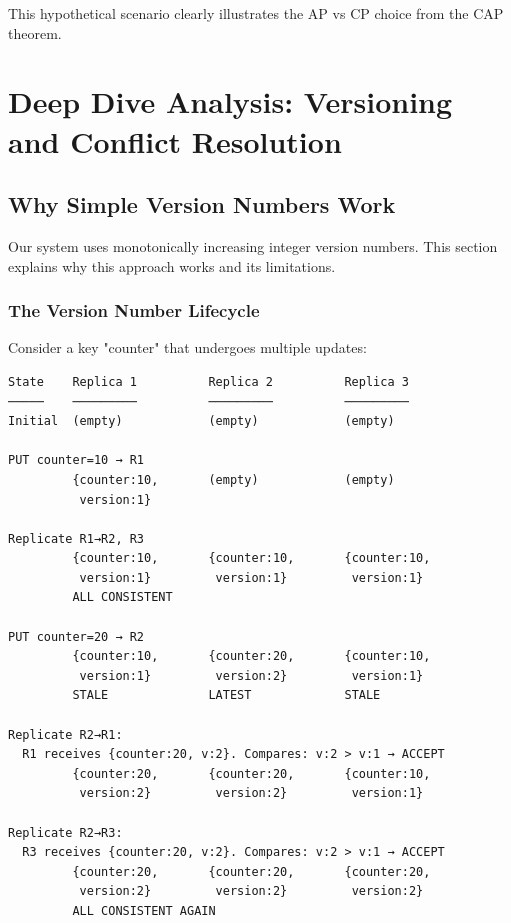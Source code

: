 \documentclass[10pt,a4paper]{article}
\begin{document}
This hypothetical scenario clearly illustrates the AP vs CP choice from the CAP theorem.

\newpage

\section{Deep Dive Analysis: Versioning and Conflict Resolution}

\subsection{Why Simple Version Numbers Work}

Our system uses monotonically increasing integer version numbers. This section explains why this approach works and its limitations.

\subsubsection{The Version Number Lifecycle}

Consider a key "counter" that undergoes multiple updates:

\begin{verbatim}
State    Replica 1          Replica 2          Replica 3
─────    ─────────          ─────────          ─────────
Initial  (empty)            (empty)            (empty)

PUT counter=10 → R1
         {counter:10,       (empty)            (empty)
          version:1}

Replicate R1→R2, R3
         {counter:10,       {counter:10,       {counter:10,
          version:1}         version:1}         version:1}
         ALL CONSISTENT

PUT counter=20 → R2
         {counter:10,       {counter:20,       {counter:10,
          version:1}         version:2}         version:1}
         STALE              LATEST             STALE

Replicate R2→R1:
  R1 receives {counter:20, v:2}. Compares: v:2 > v:1 → ACCEPT
         {counter:20,       {counter:20,       {counter:10,
          version:2}         version:2}         version:1}

Replicate R2→R3:
  R3 receives {counter:20, v:2}. Compares: v:2 > v:1 → ACCEPT
         {counter:20,       {counter:20,       {counter:20,
          version:2}         version:2}         version:2}
         ALL CONSISTENT AGAIN
\end{verbatim}
\end{document}
